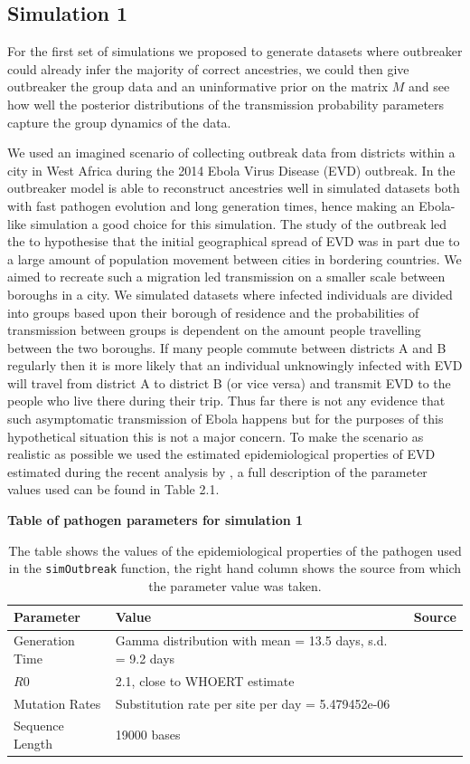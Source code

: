 \documentclass[11pt,a4paper]{report}
\begin{document}
\subsection{Simulation 1}
For the first set of simulations we proposed to generate datasets where outbreaker could already infer the majority of correct ancestries, we could then give outbreaker the group data and an uninformative prior on the matrix $M$ and see how well the posterior distributions of the transmission probability parameters capture the group dynamics of the data.

We used an imagined scenario of collecting outbreak data from districts within a city in West Africa during the 2014 Ebola Virus Disease (EVD) outbreak. In \citet{outbrkr} the outbreaker model is able to reconstruct ancestries well in simulated datasets both with fast pathogen evolution and long generation times, hence making an Ebola-like simulation a good choice for this simulation. The study of the outbreak led the \citet{Ebola14} to hypothesise that the initial geographical spread of EVD was in part due to a large amount of population movement between cities in bordering countries. We aimed to recreate such a migration led transmission on a smaller scale between boroughs in a city. We simulated datasets where infected individuals are divided into groups based upon their borough of residence and the probabilities of transmission between groups is dependent on the amount people travelling between the two boroughs. If many people commute between districts A and B regularly then it is more likely that an individual unknowingly infected with EVD will travel from district A to district B (or vice versa) and transmit EVD to the people who live there during their trip. Thus far there is not any evidence that such asymptomatic transmission of Ebola happens but for the purposes of this hypothetical situation this is not a major concern. To make the scenario as realistic as possible  we used the estimated epidemiological properties of EVD estimated during the recent analysis by \citet{Ebola14}, a full description of the parameter values used can be found in Table 2.1.

\begin{table}[h!]
\centering
{\bf Table of pathogen parameters for simulation 1}
\caption{The table shows the values of the epidemiological properties of the pathogen used in the {\tt simOutbreak} function, the right hand column shows the source from which the parameter value was taken.}
\begin{tabular}{| l | p{4cm} | p{4cm} |}
\hline
Parameter & Value & Source \\
\hline
Generation Time & Gamma distribution with mean = 13.5 days, s.d. = 9.2 days & \citet{Ebola14} \\
\hline
$R0$ & 2.1, close to WHOERT estimate & \citet{Ebola14} \\
\hline
Mutation Rates & Substitution rate per site per day =  5.479452e-06 & \citet{Gire14} \\
\hline
Sequence Length & 19000 bases & \citet{Volchkov99} \\
\hline
\end{tabular}
\end{table}
\end{document}
